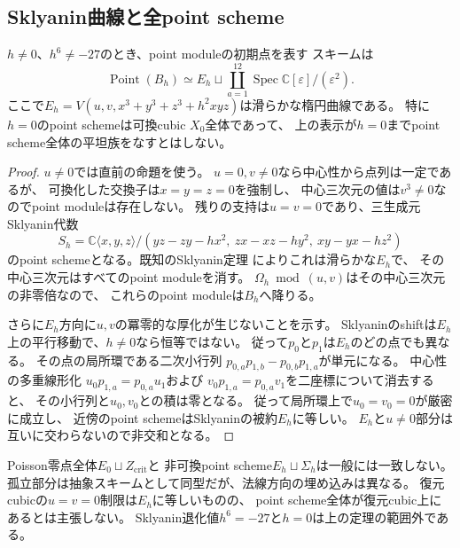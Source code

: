 \subsection{Sklyanin曲線と全point scheme}
\begin{theorem}\label{ps39:thm:global}
$h\ne0$、$h^6\ne-27$のとき、point moduleの初期点を表す
スキームは
\[
\boxed{\quad
\operatorname{Point}(B_h)
\simeq E_h\sqcup\coprod_{a=1}^{12}
\operatorname{Spec}\mathbb C[\varepsilon]/(\varepsilon^2).
\quad}
\]
ここで$E_h=V(u,v,x^3+y^3+z^3+h^2xyz)$は滑らかな楕円曲線である。
特に$h=0$のpoint schemeは可換cubic $X_0$全体であって、
上の表示が$h=0$までpoint scheme全体の平坦族をなすとはしない。
\end{theorem}
\begin{proof}
$u\ne0$では直前の命題を使う。
$u=0,v\ne0$なら中心性から点列は一定であるが、
可換化した交換子は$x=y=z=0$を強制し、
中心三次元の値は$v^3\ne0$なのでpoint moduleは存在しない。
残りの支持は$u=v=0$であり、三生成元Sklyanin代数
\[
S_h=\mathbb C\langle x,y,z\rangle/
(yz-zy-hx^2,\ zx-xz-hy^2,\ xy-yx-hz^2)
\]
のpoint schemeとなる。既知のSklyanin定理
\cite{PSPSmithTate,PSPDeLaet}によりこれは滑らかな$E_h$で、
その中心三次元はすべてのpoint moduleを消す。
$\Omega_h\bmod(u,v)$はその中心三次元の非零倍なので、
これらのpoint moduleは$B_h$へ降りる。

さらに$E_h$方向に$u,v$の冪零的な厚化が生じないことを示す。
Sklyaninのshiftは$E_h$上の平行移動で、$h\ne0$なら恒等ではない。
従って$p_0$と$p_1$は$E_h$のどの点でも異なる。
その点の局所環である二次小行列
$p_{0,a}p_{1,b}-p_{0,b}p_{1,a}$が単元になる。
中心性の多重線形化
$u_0p_{1,a}=p_{0,a}u_1$および
$v_0p_{1,a}=p_{0,a}v_1$を二座標について消去すると、
その小行列と$u_0,v_0$との積は零となる。
従って局所環上で$u_0=v_0=0$が厳密に成立し、
近傍のpoint schemeはSklyaninの被約$E_h$に等しい。
$E_h$と$u\ne0$部分は互いに交わらないので非交和となる。
\end{proof}

\begin{remark}[結論の範囲]
Poisson零点全体$E_0\sqcup Z_{\mathrm{crit}}$と
非可換point scheme$E_h\sqcup\Sigma_h$は一般には一致しない。
孤立部分は抽象スキームとして同型だが、法線方向の埋め込みは異なる。
復元cubicの$u=v=0$制限は$E_h$に等しいものの、
point scheme全体が復元cubic上にあるとは主張しない。
Sklyanin退化値$h^6=-27$と$h=0$は上の定理の範囲外である。
\end{remark}
